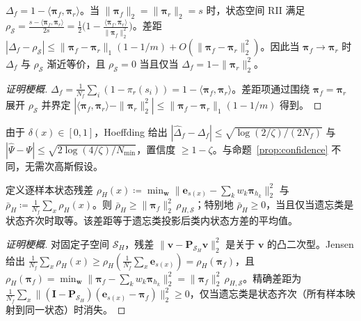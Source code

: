 \begin{proposition}
\label{prop:pssd_rii}
$\Delta_f = 1-\langle\boldsymbol{\pi}_f,\boldsymbol{\pi}_r\rangle$。当 $\|\boldsymbol{\pi}_f\|_2=\|\boldsymbol{\pi}_r\|_2=s$ 时，状态空间 RII 满足 $\rho_{\mathcal{S}}=\frac{s-\langle\boldsymbol{\pi}_f,\boldsymbol{\pi}_r\rangle}{2s}=\frac{1}{2}\bigl(1-\frac{\langle\boldsymbol{\pi}_f,\boldsymbol{\pi}_r\rangle}{\|\boldsymbol{\pi}_f\|_2^2}\bigr)$。差距 $|\Delta_f-\rho_{\mathcal{S}}|\le\|\boldsymbol{\pi}_f-\boldsymbol{\pi}_r\|_1(1-1/m)+O(\|\boldsymbol{\pi}_f-\boldsymbol{\pi}_r\|_2^2)$。因此当 $\boldsymbol{\pi}_f\to\boldsymbol{\pi}_r$ 时 $\Delta_f$ 与 $\rho_{\mathcal{S}}$ 渐近等价，且 $\rho_{\mathcal{S}}=0$ 当且仅当 $\Delta_f = 1-\|\boldsymbol{\pi}_r\|_2^2$。
\end{proposition}

\begin{proof}[证明梗概]
$\Delta_f=\frac1{N_f}\sum_i(1-\pi_r(s_i))=1-\langle\boldsymbol{\pi}_f,\boldsymbol{\pi}_r\rangle$。差距项通过围绕 $\boldsymbol{\pi}_f=\boldsymbol{\pi}_r$ 展开 $\rho_{\mathcal{S}}$ 并界定 $|\langle\boldsymbol{\pi}_f,\boldsymbol{\pi}_r\rangle-\|\boldsymbol{\pi}_r\|_2^2|\le\|\boldsymbol{\pi}_f-\boldsymbol{\pi}_r\|_1(1-1/m)$ 得到。
\end{proof}

\begin{proposition}[集中界]
\label{prop:pssd_conc}
由于 $\delta(x)\in[0,1]$，Hoeffding 给出 $|\hat{\Delta}_f-\Delta_f|\le\sqrt{\log(2/\zeta)/(2N_f)}$ 与 $|\hat{\Psi}-\Psi|\le\sqrt{2\log(4/\zeta)/N_{\min}}$，置信度 $\ge1-\zeta$。与命题~\ref{prop:confidence} 不同，无需次高斯假设。
\end{proposition}

\begin{proposition}
\label{prop:ps_mhpr}
定义逐样本状态残差 $\rho_H(x)\coloneqq\min_{\mathbf{w}}\|\mathbf{e}_{s(x)}-\sum_k w_k\boldsymbol{\pi}_{h_k}\|_2^2$ 与 $\bar{\rho}_H\coloneqq\frac1{N_f}\sum_x\rho_H(x)$。则 $\bar{\rho}_H \ge \|\boldsymbol{\pi}_f\|_2^2\,\rho_{H,\mathcal{S}}$；特别地 $\bar{\rho}_H\ge0$，当且仅当遗忘类是状态齐次时取等。该差距等于遗忘类投影后类内状态方差的平均值。
\end{proposition}

\begin{proof}[证明梗概]
对固定子空间 $\mathcal{S}_H$，残差 $\|\mathbf{v}-\mathbf{P}_{\mathcal{S}_H}\mathbf{v}\|_2^2$ 是关于 $\mathbf{v}$ 的凸二次型。Jensen 给出 $\frac1{N_f}\sum_x\rho_H(x)\ge\rho_H(\frac1{N_f}\sum_x\mathbf{e}_{s(x)})=\rho_H(\boldsymbol{\pi}_f)$，且 $\rho_H(\boldsymbol{\pi}_f)=\min_{\mathbf{w}}\|\boldsymbol{\pi}_f-\sum_k w_k\boldsymbol{\pi}_{h_k}\|_2^2=\|\boldsymbol{\pi}_f\|_2^2\,\rho_{H,\mathcal{S}}$。精确差距为 $\frac1{N_f}\sum_x\|(\mathbf{I}-\mathbf{P}_{\mathcal{S}_H})(\mathbf{e}_{s(x)}-\boldsymbol{\pi}_f)\|_2^2\ge0$，仅当遗忘类是状态齐次（所有样本映射到同一状态）时消失。
\end{proof}

